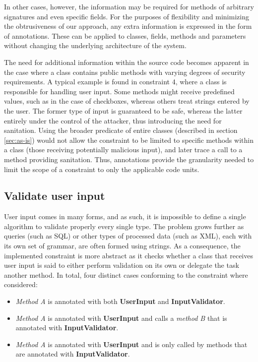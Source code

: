 In other cases, however, the information may be required for methods of arbitrary signatures and even specific fields. For the purposes of flexibility and minimizing the obtrusiveness of our approach, any extra information is expressed in the form of annotations. These can be applied to classes, fields, methods and parameters without changing the underlying architecture of the system.

The need for additional information within the source code becomes apparent in the case where a class contains public methods with varying degrees of security requirements. A typical example is found in constraint 4, where a class is responsible for handling user input. Some methods might receive predefined values, such as in the case of checkboxes, whereas others treat strings entered by the user.  The former type of input is guaranteed to be safe, whereas the latter entirely under the control of the attacker, thus introducing the need for sanitation. Using the broader predicate of entire classes (described in section \ref{sec:as-is}) would not allow the constraint to be limited to specific methods within a class (those receiving potentially malicious input), and later trace a call to a method providing sanitation. Thus, annotations provide the granularity needed to limit the scope of a constraint to only the applicable code units.



\subsection{Validate user input}
User input comes in many forms, and as such, it is impossible to define a single algorithm to validate properly every single type. The problem grows further as queries (such as SQL) or other types of processed data (such as XML), each with its own set of grammar, are often formed using strings. As a consequence, the implemented constraint is more abstract as it checks whether a class that receives user input is said to either perform validation on its own or delegate the task another method. In total, four distinct cases conforming to the constraint where considered: 

\begin{itemize}
    \item \textit{Method A} is annotated with both \textbf{UserInput} and \textbf{InputValidator}.
    
    \item \textit{Method A} is annotated with \textbf{UserInput} and calls a \textit{method B} that is annotated with \textbf{InputValidator}.
    
    \item \textit{Method A} is annotated with \textbf{UserInput} and is only called by methods that are annotated with \textbf{InputValidator}.
\end{itemize}

